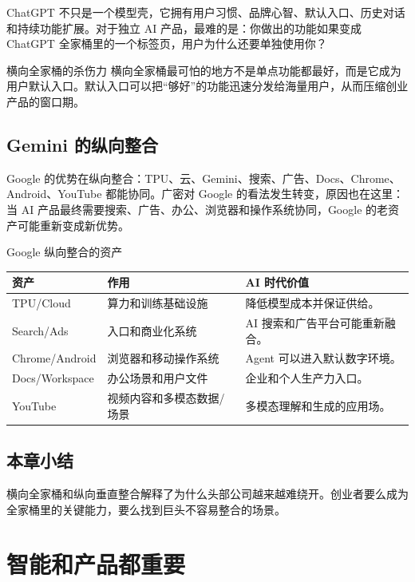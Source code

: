 \documentclass[a4paper]{article}
\begin{document}
ChatGPT 不只是一个模型壳，它拥有用户习惯、品牌心智、默认入口、历史对话和持续功能扩展。对于独立 AI 产品，最难的是：你做出的功能如果变成 ChatGPT 全家桶里的一个标签页，用户为什么还要单独使用你？

\begin{importantbox}{横向全家桶的杀伤力}
横向全家桶最可怕的地方不是单点功能都最好，而是它成为用户默认入口。默认入口可以把“够好”的功能迅速分发给海量用户，从而压缩创业产品的窗口期。
\end{importantbox}

\subsection{Gemini 的纵向整合}

Google 的优势在纵向整合：TPU、云、Gemini、搜索、广告、Docs、Chrome、Android、YouTube 都能协同。广密对 Google 的看法发生转变，原因也在这里：当 AI 产品最终需要搜索、广告、办公、浏览器和操作系统协同，Google 的老资产可能重新变成新优势。

\begin{knowledgebox}{Google 纵向整合的资产}
\begin{tabularx}{\textwidth}{p{}p{}X}
\toprule
资产 & 作用 & AI 时代价值 \\
\midrule
TPU/Cloud & 算力和训练基础设施 & 降低模型成本并保证供给。 \\
Search/Ads & 入口和商业化系统 & AI 搜索和广告平台可能重新融合。 \\
Chrome/Android & 浏览器和移动操作系统 & Agent 可以进入默认数字环境。 \\
Docs/Workspace & 办公场景和用户文件 & 企业和个人生产力入口。 \\
YouTube & 视频内容和多模态数据/场景 & 多模态理解和生成的应用场。 \\
\bottomrule
\end{tabularx}
\end{knowledgebox}

\subsection{本章小结}

横向全家桶和纵向垂直整合解释了为什么头部公司越来越难绕开。创业者要么成为全家桶里的关键能力，要么找到巨头不容易整合的场景。

\section{智能和产品都重要}
\end{document}

